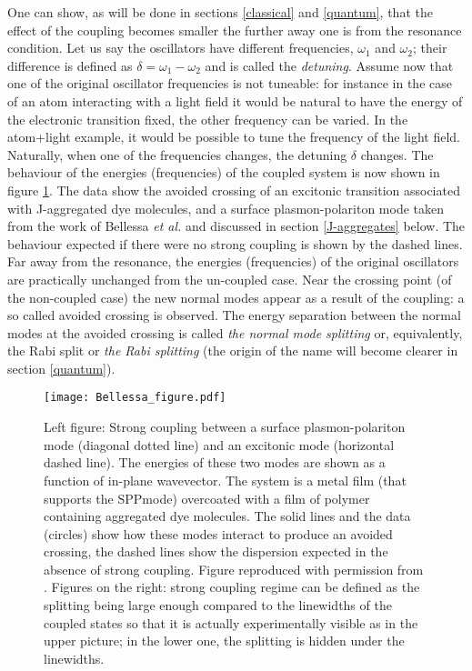 \documentclass[12pt]{iopart}
\begin{document}
One can show, as will be done in sections \ref{classical} and \ref{quantum}, that the effect of the coupling becomes smaller the further away one is from the resonance condition. Let us say the oscillators have different frequencies, $\omega_1$ and $\omega_2$; their difference is defined as $\delta = \omega_1 - \omega_2$ and is called the {\it detuning}. Assume now that one of the original oscillator frequencies is not tuneable: for instance in the case of an atom interacting with a light field it would be natural to have the energy of the electronic transition fixed, the other frequency can be varied. In the atom+light example, it would be possible to tune the frequency of the light field. Naturally, when one of the frequencies changes, the detuning $\delta$ changes. The behaviour of the energies (frequencies) of the coupled system is now shown in figure \ref{Bellessa_figure}. The data show the avoided crossing of an excitonic transition associated with J-aggregated dye molecules, and a surface plasmon-polariton mode taken from the work of Bellessa {\it et al.} and discussed in section \ref{J-aggregates} below.  The behaviour expected if there were no strong coupling is shown by the dashed lines. Far away from the resonance, the energies (frequencies) of the original oscillators are practically unchanged from the un-coupled case. Near the crossing point (of the non-coupled case) the new normal modes appear as a result of the coupling: a so called avoided crossing is observed. The energy separation between the normal modes at the avoided crossing is called {\it the normal mode splitting} or, equivalently, the Rabi split or {\it the Rabi splitting} (the origin of the name will become clearer in section \ref{quantum}).      

\begin{figure}
\texttt{[image: Bellessa\_figure.pdf]}
\caption{Left figure: Strong coupling between a surface plasmon-polariton mode (diagonal dotted line) and an excitonic mode (horizontal dashed line). The energies of these two modes are shown as a function of in-plane wavevector. The system is a metal film (that supports the SPPmode) overcoated with a film of polymer containing aggregated dye molecules. The solid lines and the data (circles) show how these modes interact to produce an avoided crossing, the dashed lines show the dispersion expected in the absence of strong coupling. Figure reproduced with permission from \cite{Bellessa_PRL_2004_93_036404}. Figures on the right: strong coupling regime can be defined as the splitting being large enough compared to the linewidths of the coupled states so that it is actually experimentally visible as in the upper picture; in the lower one, the splitting is hidden under the linewidths.}
\label{Bellessa_figure}
\end{figure}
\end{document}
